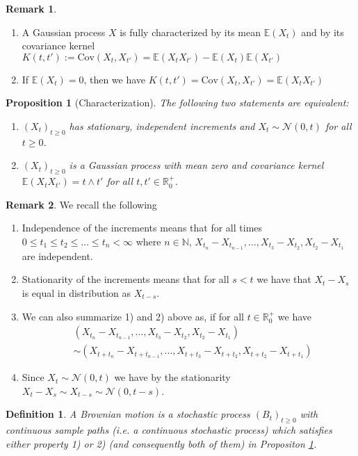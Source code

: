 \documentclass[11pt,a4paper, final]{article}
\newtheorem{prop}{Proposition}[section]
\newtheorem{defn}{Definition}[section]
\theoremstyle{definition}
\newtheorem{rem}{Remark}[section]
\begin{document}
\begin{rem} \ \begin{enumerate}
\item A Gaussian process $X$ is fully characterized by its mean $\mathbb{E}(X_t)$ and by its covariance kernel $K(t,t'):= \text{Cov}(X_t, X_{t'})= \mathbb{E}(X_t X_{t'})- \mathbb{E}(X_t) \mathbb{E}(X_{t'})$ 
\item If $\mathbb{E}(X_t)=0$, then we have $K(t,t')=\text{Cov}(X_t, X_{t'})=\mathbb{E}(X_tX_{t'})$
\end{enumerate}
\end{rem}
\newpage 
\begin{prop}[Characterization] \label{charbmprop} The following two statements are equivalent:
\begin{enumerate}
\item $(X_t)_{t \geq 0}$ has stationary, independent increments and $X_t \sim \mathcal{N}(0,t)$ for all $t \geq 0$.
\item $(X_t)_{t \geq 0}$ is a Gaussian process with mean zero and covariance kernel $\mathbb{E}(X_t X_{t'}) = t  \wedge t'$ for all $t,t' \in  \mathbb{R}_{0}^+$. 
\end{enumerate}
\end{prop}
\begin{rem} We recall the following
\begin{enumerate}
\item Independence of the increments means that for all times $0 \leq t_1 \leq t_2  \leq \dots \leq t_n< \infty$ where $n \in \mathbb{N}$, $X_{t_n}-X_{t_{n-1}}, \dots , X_{t_3}-X_{t_2}, X_{t_2}-X_{t_1}$ are independent.
\item Stationarity of the increments means that for all $s <t$ we have that $X_t-X_s$ is equal in distribution as $X_{t-s}$. 
\item We can also summarize 1) and 2) above as, if for all $t \in \mathbb{R}_0^+$ we have  \begin{align*}
&(X_{t_n}-X_{t_{n-1}} , \dots , X_{t_3}-X_{t_2}, X_{t_2}-X_{t_1}) \\  &\sim (X_{t+t_n}-X_{t+t_{n-1}} , \dots , X_{t+t_3}-X_{t+t_2}, X_{t+t_2}-X_{t+t_1})
\end{align*} 
\item Since $X_t \sim \mathcal{N}(0,t)$ we have by the stationarity $X_t-X_s \sim X_{t-s} \sim  \mathcal{N}(0,t-s)$. 
\end{enumerate}
\end{rem}
\begin{defn} A Brownian motion is a stochastic process $(B_t)_{t \geq 0}$ with continuous sample paths (i.e. a continuous stochastic process) which satisfies either property 1) or 2) (and consequently both of them) in Propositon \ref{charbmprop}.
\end{defn}
\end{document}
